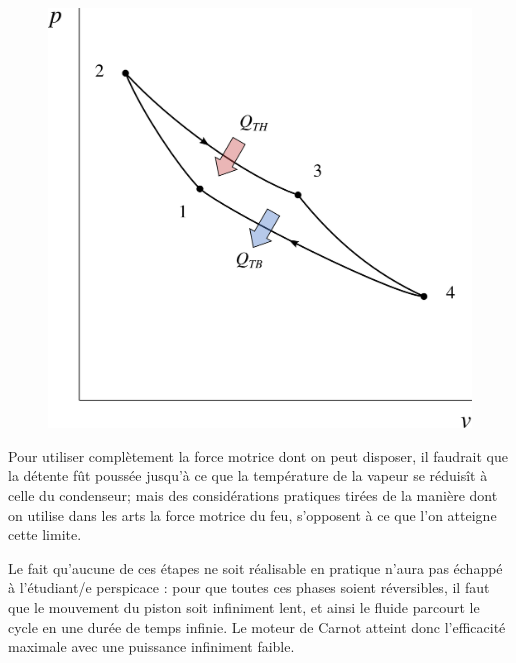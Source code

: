 		\begin{figure}[htc]%
			\begin{center}
				\includegraphics[width=\didacticpvdiagramwidth]{images/carnot_pv_gp_moteur.png}
			\end{center}
			\label{fig_p-v_gp_carnot}
		\end{figure}

			Pour utiliser complètement la force motrice dont on peut disposer, il faudrait que la détente fût poussée jusqu’à ce que la température de la vapeur se réduisît à celle du condenseur; mais des considérations pratiques tirées de la manière dont on utilise dans les arts la force motrice du feu, s’opposent à ce que l’on atteigne cette limite.

		Le fait qu’aucune de ces étapes ne soit réalisable en pratique n’aura pas échappé à l’étudiant/e perspicace : pour que toutes ces phases soient réversibles, il faut que le mouvement du piston soit infiniment lent, et ainsi le fluide parcourt le cycle en une durée de temps infinie. Le moteur de Carnot atteint donc l’efficacité maximale avec une puissance infiniment faible.
		

